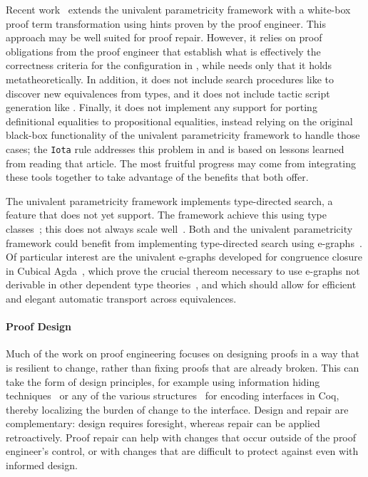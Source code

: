Recent work~\cite{tabareau2019marriage} extends the univalent parametricity framework with 
a white-box proof term transformation using hints proven by the proof engineer.
This approach may be well suited for proof repair.
However, it relies on proof obligations from the proof engineer that establish what is effectively the correctness criteria
for the configuration in \toolname, while \toolname needs only that it holds metatheoretically.
In addition, it does not include search procedures like \toolname to discover new equivalences from types,
and it does not include tactic script generation like \toolname.
Finally, it does not implement any support for porting definitional equalities to propositional equalities,
instead relying on the original black-box functionality of the univalent parametricity framework to handle those cases;
the \lstinline{Iota} rule addresses this problem in \toolname and is based on lessons learned from reading that article.
The most fruitful progress may come from integrating these tools together to take advantage of the benefits that both offer.

The univalent parametricity framework implements type-directed search, a feature that \toolname does not yet support.
The framework achieve this using type classes~\cite{Sozeau2008}; this does not always scale well~\cite{tabareau2019marriage}.
Both \toolname and the univalent parametricity framework could benefit from implementing type-directed search using e-graphs~\cite{egraph1}.
Of particular interest are the univalent e-graphs developed for congruence closure in Cubical Agda~\cite{egraph6},
which prove the crucial thereom necessary to use e-graphs not derivable in other dependent type theories~\cite{egraph7},
and which should allow for efficient and elegant automatic transport across equivalences.

\paragraph{Proof Design}

Much of the work on proof engineering focuses on designing proofs
in a way that is resilient to change, rather than fixing proofs that are already broken.
This can take the form of design principles, for example using 
information hiding techniques~\cite{Woos:2016:PCF:2854065.2854081, Klein:2014:CFV:2584468.2560537}
or any of the various structures~\cite{Chrzaszcz2003, Sozeau2008, Saibi:PhD} for encoding interfaces in Coq,
thereby localizing the burden of change to the interface.
Design and repair are complementary: design requires foresight, whereas repair can be applied retroactively.
Proof repair can help with changes that occur outside of the proof engineer's control,
or with changes that are difficult to protect against even with informed design.

